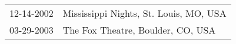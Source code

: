 \begin{supertabular}{ll}
 12-14-2002 &  Mississippi Nights, St. Louis, MO, USA \\
 03-29-2003 &       The Fox Theatre, Boulder, CO, USA \\
\end{supertabular}
